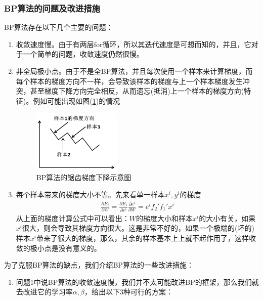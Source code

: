 {        \subsubsection{BP算法的问题及改进措施}
            \par
            BP算法存在以下几个主要的问题：
            \begin{enumerate}
            \item 收敛速度慢。由于有两层for循环，所以其迭代速度是可想而知的，并且，它对于一个简单的问题，收敛速度仍然很慢。
            \item 非全局极小点。由于不是全BP算法，并且每次使用一个样本来计算梯度，而每个样本的梯度方向不一样，会导致该样本的梯度与上一个样本梯度发生冲突，甚至梯度下降方向完全相反，从而遗忘(抵消)上一个样本的梯度方向(特征)。例如可能出现如图(\ref{fig:BP算法的锯齿梯度下降示意图})的情况
            \begin{figure}[H]
            \centering
            \includegraphics[height=3cm]{images/BP_algorithm_to_reduce_sawtooth_gradient.jpg}
            \caption{BP算法的锯齿梯度下降示意图}
            \label{fig:BP算法的锯齿梯度下降示意图}
            \end{figure}
            \item 每个样本带来的梯度大小不等。先来看单一样本$x^i,y^i$的梯度
            \begin{align*}
            \frac{\partial E_i}{\partial W }= \frac{\partial E_i}{\partial e^i}\frac{\partial e^i}{\partial W} = e^i f_2'f_1'x^i
            \end{align*}
            从上面的梯度计算公式中可以看出：$W$的梯度大小和样本$x^i$的大小有关，如果$x^i$很大，则会导致其梯度方向很大。这是非常不好的，如果一个极端的(坏的)样本$x^i$带来了很大的梯度，那么，其余的样本基本上上就不起作用了，这样收敛的极小点是没有意义的。
            \end{enumerate}
            为了克服BP算法的缺点，我们介绍BP算法的一些改进措施：
            \begin{enumerate}
            \item 问题1中说BP算法的收敛速度慢，我们并不太可能改进BP的框架，那么我们就去改进它的学习率$\alpha,\beta$，给出以下3种可行的方案：

\end{enumerate}}
